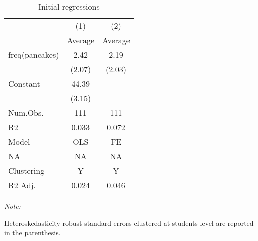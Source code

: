 \begin{table}

\caption{Initial regressions}
\centering
\begin{threeparttable}
\begin{tabular}[t]{lcc}
\toprule
\multicolumn{1}{c}{ } & \multicolumn{1}{c}{(1)} & \multicolumn{1}{c}{(2)} \\
\cmidrule(l{3pt}r{3pt}){2-2} \cmidrule(l{3pt}r{3pt}){3-3}
  & Average & Average \\
\midrule
freq(pancakes) & 2.42 & 2.19\\
 & (2.07) & (2.03)\\
Constant & 44.39 & \\
 & (3.15) & \\
\midrule
Num.Obs. & 111 & 111\\
R2 & 0.033 & 0.072\\
Model & OLS & FE\\
NA & NA & NA\\
Clustering & Y & Y\\
R2 Adj. & 0.024 & 0.046\\
\bottomrule
\end{tabular}
\begin{tablenotes}
\item \textit{Note: } 
\item Heteroskedasticity-robust standard errors clustered at students level are reported in the parenthesis.
\end{tablenotes}
\end{threeparttable}
\end{table}
